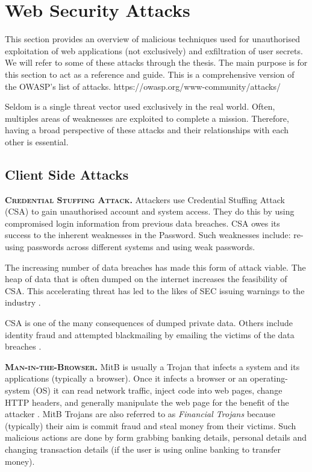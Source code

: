 \section{Web Security Attacks}
\label{sec::chp2::security-attacks}

%

This section provides an overview of malicious techniques used for unauthorised exploitation of web applications (not exclusively) and exfiltration of user secrets. We will refer to some of these attacks through the thesis. The main purpose is for this section to act as a reference and guide. This is a comprehensive version of the OWASP's list of attacks. https://owasp.org/www-community/attacks/

Seldom is a single threat vector used exclusively in the real world. Often, multiples areas of weaknesses are exploited to complete a mission. Therefore, having a broad perspective of these attacks and their relationships with each other is essential.


\subsection{Client Side Attacks}
\label{chp2::client-side-attacks}

\textbf{\textsc{Credential Stuffing Attack.}} Attackers use Credential Stuffing Attack (CSA) to gain unauthorised account and system access. They do this by using compromised login information from previous data breaches. CSA owes its success to the inherent weaknesses in the Password. Such weaknesses include: re-using passwords across different systems and using weak passwords.

The increasing number of data breaches has made this form of attack viable. The heap of data that is often dumped on the internet increases the feasibility of CSA. This accelerating threat has led to the likes of SEC issuing warnings to the industry \cite{noauthor_secgov_2020}.

CSA is one of the many consequences of dumped private data. Others include identity fraud and attempted blackmailing by emailing the victims of the data breaches \cite{noauthor_scam_2020}.

\textbf{\textsc{Man-in-the-Browser.}} MitB is usually a Trojan that infects a system and its applications (typically a browser). Once it infects a browser or an operating-system (OS) it can read network traffic, inject code into web pages, change HTTP headers, and generally manipulate the web page for the benefit of the attacker \cite{noauthor_man---browser_2020}. MitB Trojans are also referred to as \emph{Financial Trojans} because (typically) their aim is commit fraud and steal money from their victims. Such malicious actions are done by form grabbing banking details, personal details and changing transaction details (if the user is using online banking to transfer money).

